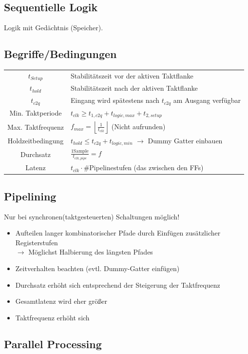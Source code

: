 \documentclass[6pt,a4paper]{scrartcl}
\newcommand{\ra}[0]{\ensuremath{\rightarrow}} 									%
\begin{document}
\begin{multicols*}{3}
\section{Sequentielle Logik}
Logik mit Gedächtnis (Speicher).
	\subsection{Begriffe/Bedingungen}
	\begin{tabular}{c|l}
	$t_{Setup}$ & Stabilitätszeit vor der aktiven Taktflanke\\
	$t_{hold}$ & Stabilitätszeit nach  der aktiven Taktflanke\\
	$t_{c2q}$ & Eingang wird spätestens nach $t_{c2q}$ am Ausgang verfügbar\\
	 Min. Taktperiode &  $t_{clk} \ge t_{1,c2q} + t_{logic,max} + t_{2,setup}$  \\
	 Max. Taktfrequenz & $f_{max} = \left\lfloor \frac{1}{t_{clk}} \right\rfloor$ \qquad (Nicht aufrunden) \\
	 Holdzeitbedingung & $t_{hold} \le t_{c2q} + t_{logic,min}$  $\ra$ Dummy Gatter einbauen\\
	 Durchsatz & $\frac{1 \text{Sample}}{t_{clk,pipe}} = f$ \\
	 Latenz & $t_{clk} \cdot \#$Pipelinestufen (das zwischen den FFs) \\
	\end{tabular}
	
	
	\subsection{Pipelining} %
	Nur bei synchronen(taktgesteuerten) Schaltungen möglich!
	\begin{itemize} \itemsep0pt
		\item Aufteilen langer kombinatorischer Pfade durch Einfügen zusätzlicher Registerstufen\\
		$\ra$ Möglichst Halbierung des längsten Pfades
		\item Zeitverhalten beachten (evtl. Dummy-Gatter einfügen)
		\item Durchsatz erhöht sich entsprechend der Steigerung der Taktfrequenz
		\item Gesamtlatenz wird eher größer
		\item Taktfrequenz erhöht sich
	\end{itemize}
	
	\subsection{Parallel Processing} %
	

\end{multicols*}
\end{document}
